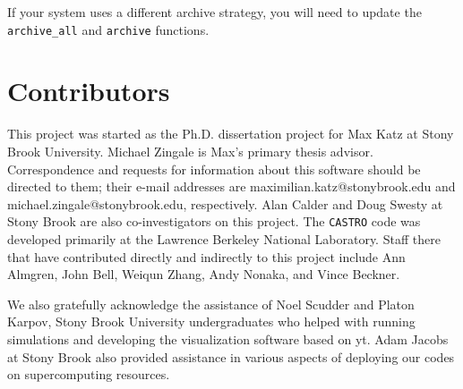 \documentclass[12pt]{book}
\begin{document}
If your system uses a different archive strategy, you will need to update the \texttt{archive\_all} 
and \texttt{archive} functions.

\chapter{Contributors}
\label{sec:contributors}

This project was started as the Ph.D. dissertation project for Max Katz at Stony Brook University. 
Michael Zingale is Max's primary thesis advisor. Correspondence and requests for information 
about this software should be directed to them; their e-mail addresses are maximilian.katz@stonybrook.edu
and michael.zingale@stonybrook.edu, respectively. Alan Calder and Doug Swesty at Stony Brook are 
also co-investigators on this project. The \texttt{CASTRO} code was developed primarily at the 
Lawrence Berkeley National Laboratory. Staff there that have contributed directly and 
indirectly to this project include Ann Almgren, John Bell, Weiqun Zhang, Andy Nonaka, and Vince Beckner.

We also gratefully acknowledge the assistance of Noel Scudder and Platon Karpov, 
Stony Brook University undergraduates who helped with running simulations and 
developing the visualization software based on yt. Adam Jacobs at Stony Brook also provided 
assistance in various aspects of deploying our codes on supercomputing resources.

\backmatter



\end{document}
